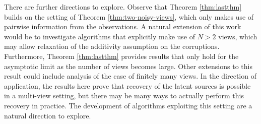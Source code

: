 There are further directions to explore.
Observe that Theorem \ref{thm:lastthm} builds on the setting of Theorem \ref{thm:two-noisy-views}, which only makes use of pairwise information from the observations.
A natural extension of this work would be to investigate algorithms that explicitly make use of $N>2$ views, which may allow relaxation of the additivity assumption on the corruptions.
Furthermore, Theorem \ref{thm:lastthm} provides results that only hold for the asymptotic limit as the number of views becomes large.
Other extensions to this result could include analysis of the case of finitely many views.
In the direction of application, the results here prove that recovery of the latent sources is possible in a multi-view setting, but there may be many ways to actually perform this recovery in practice. 
The development of algorithms exploiting this setting are a natural direction to explore.



